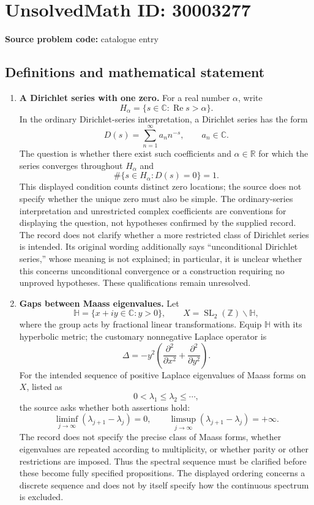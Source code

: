 \documentclass[11pt]{article}
\newcommand{\Z}{\mathbb{Z}}
\newcommand{\R}{\mathbb{R}}
\newcommand{\C}{\mathbb{C}}
\begin{document}
\section*{UnsolvedMath ID: 30003277}
\textbf{Source problem code:} catalogue entry
\subsection{Definitions and mathematical statement}
\begin{enumerate}
\item \textbf{A Dirichlet series with one zero.} For a real number \(\alpha\), write
\[
H_\alpha=\{s\in\C:\operatorname{Re}s>\alpha\}.
\]
In the ordinary Dirichlet-series interpretation, a Dirichlet series has the form
\[
D(s)=\sum_{n=1}^{\infty}a_n n^{-s},\qquad a_n\in\C.
\]
The question is whether there exist such coefficients and \(\alpha\in\R\) for which the series converges throughout \(H_\alpha\) and
\[
\#\{s\in H_\alpha:D(s)=0\}=1.
\]
This displayed condition counts distinct zero locations; the source does not specify whether the unique zero must also be simple. The ordinary-series interpretation and unrestricted complex coefficients are conventions for displaying the question, not hypotheses confirmed by the supplied record. The record does not clarify whether a more restricted class of Dirichlet series is intended. Its original wording additionally says ``unconditional Dirichlet series,'' whose meaning is not explained; in particular, it is unclear whether this concerns unconditional convergence or a construction requiring no unproved hypotheses. These qualifications remain unresolved.

\item \textbf{Gaps between Maass eigenvalues.} Let
\[
\mathbb H=\{x+iy\in\C:y>0\},\qquad
X=\operatorname{SL}_2(\Z)\backslash\mathbb H,
\]
where the group acts by fractional linear transformations. Equip \(\mathbb H\) with its hyperbolic metric; the customary nonnegative Laplace operator is
\[
\Delta=-y^2\left(\frac{\partial^2}{\partial x^2}+\frac{\partial^2}{\partial y^2}\right).
\]
For the intended sequence of positive Laplace eigenvalues of Maass forms on \(X\), listed as
\[
0<\lambda_1\leq\lambda_2\leq\cdots,
\]
the source asks whether both assertions hold:
\[
\liminf_{j\to\infty}(\lambda_{j+1}-\lambda_j)=0,
\qquad
\limsup_{j\to\infty}(\lambda_{j+1}-\lambda_j)=+\infty.
\]
The record does not specify the precise class of Maass forms, whether eigenvalues are repeated according to multiplicity, or whether parity or other restrictions are imposed. Thus the spectral sequence must be clarified before these become fully specified propositions. The displayed ordering concerns a discrete sequence and does not by itself specify how the continuous spectrum is excluded.


\end{enumerate}
\end{document}
